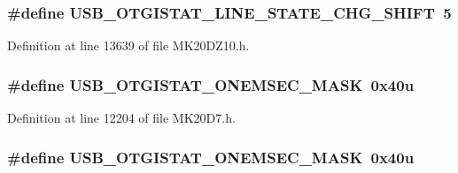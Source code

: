 \subsubsection[{\texorpdfstring{U\+S\+B\+\_\+\+O\+T\+G\+I\+S\+T\+A\+T\+\_\+\+L\+I\+N\+E\+\_\+\+S\+T\+A\+T\+E\+\_\+\+C\+H\+G\+\_\+\+S\+H\+I\+FT}{USB_OTGISTAT_LINE_STATE_CHG_SHIFT}}]{\setlength{\rightskip}{0pt plus 5cm}\#define U\+S\+B\+\_\+\+O\+T\+G\+I\+S\+T\+A\+T\+\_\+\+L\+I\+N\+E\+\_\+\+S\+T\+A\+T\+E\+\_\+\+C\+H\+G\+\_\+\+S\+H\+I\+FT~5}\hypertarget{group___u_s_b___register___masks_ga7cb2076a9bf32a49fdbc7efcfc5fb8bb}{}\label{group___u_s_b___register___masks_ga7cb2076a9bf32a49fdbc7efcfc5fb8bb}


Definition at line 13639 of file M\+K20\+D\+Z10.\+h.

\subsubsection[{\texorpdfstring{U\+S\+B\+\_\+\+O\+T\+G\+I\+S\+T\+A\+T\+\_\+\+O\+N\+E\+M\+S\+E\+C\+\_\+\+M\+A\+SK}{USB_OTGISTAT_ONEMSEC_MASK}}]{\setlength{\rightskip}{0pt plus 5cm}\#define U\+S\+B\+\_\+\+O\+T\+G\+I\+S\+T\+A\+T\+\_\+\+O\+N\+E\+M\+S\+E\+C\+\_\+\+M\+A\+SK~0x40u}\hypertarget{group___u_s_b___register___masks_gaa59b13f2f60173eaf2844dd089a6b31a}{}\label{group___u_s_b___register___masks_gaa59b13f2f60173eaf2844dd089a6b31a}


Definition at line 12204 of file M\+K20\+D7.\+h.

\subsubsection[{\texorpdfstring{U\+S\+B\+\_\+\+O\+T\+G\+I\+S\+T\+A\+T\+\_\+\+O\+N\+E\+M\+S\+E\+C\+\_\+\+M\+A\+SK}{USB_OTGISTAT_ONEMSEC_MASK}}]{\setlength{\rightskip}{0pt plus 5cm}\#define U\+S\+B\+\_\+\+O\+T\+G\+I\+S\+T\+A\+T\+\_\+\+O\+N\+E\+M\+S\+E\+C\+\_\+\+M\+A\+SK~0x40u}\hypertarget{group___u_s_b___register___masks_gaa59b13f2f60173eaf2844dd089a6b31a}{}\label{group___u_s_b___register___masks_gaa59b13f2f60173eaf2844dd089a6b31a}


